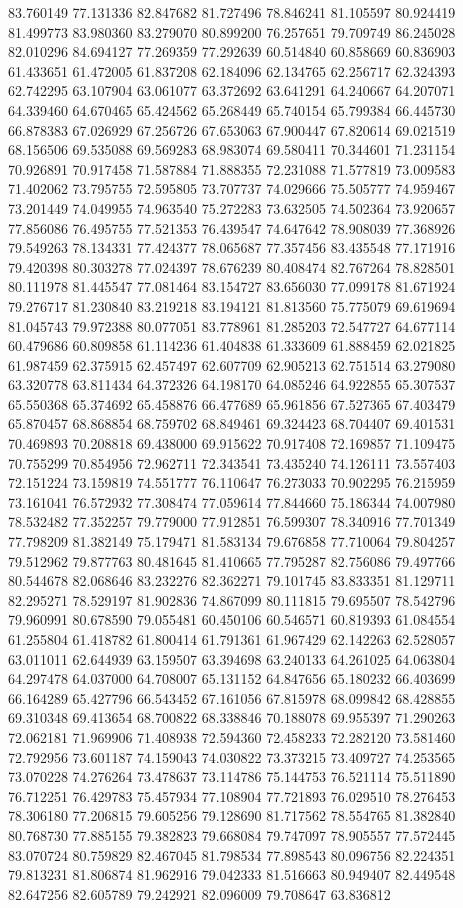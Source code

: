 83.760149
77.131336
82.847682
81.727496
78.846241
81.105597
80.924419
81.499773
83.980360
83.279070
80.899200
76.257651
79.709749
86.245028
82.010296
84.694127
77.269359
77.292639
60.514840
60.858669
60.836903
61.433651
61.472005
61.837208
62.184096
62.134765
62.256717
62.324393
62.742295
63.107904
63.061077
63.372692
63.641291
64.240667
64.207071
64.339460
64.670465
65.424562
65.268449
65.740154
65.799384
66.445730
66.878383
67.026929
67.256726
67.653063
67.900447
67.820614
69.021519
68.156506
69.535088
69.569283
68.983074
69.580411
70.344601
71.231154
70.926891
70.917458
71.587884
71.888355
72.231088
71.577819
73.009583
71.402062
73.795755
72.595805
73.707737
74.029666
75.505777
74.959467
73.201449
74.049955
74.963540
75.272283
73.632505
74.502364
73.920657
77.856086
76.495755
77.521353
76.439547
74.647642
78.908039
77.368926
79.549263
78.134331
77.424377
78.065687
77.357456
83.435548
77.171916
79.420398
80.303278
77.024397
78.676239
80.408474
82.767264
78.828501
80.111978
81.445547
77.081464
83.154727
83.656030
77.099178
81.671924
79.276717
81.230840
83.219218
83.194121
81.813560
75.775079
69.619694
81.045743
79.972388
80.077051
83.778961
81.285203
72.547727
64.677114
60.479686
60.809858
61.114236
61.404838
61.333609
61.888459
62.021825
61.987459
62.375915
62.457497
62.607709
62.905213
62.751514
63.279080
63.320778
63.811434
64.372326
64.198170
64.085246
64.922855
65.307537
65.550368
65.374692
65.458876
66.477689
65.961856
67.527365
67.403479
65.870457
68.868854
68.759702
68.849461
69.324423
68.704407
69.401531
70.469893
70.208818
69.438000
69.915622
70.917408
72.169857
71.109475
70.755299
70.854956
72.962711
72.343541
73.435240
74.126111
73.557403
72.151224
73.159819
74.551777
76.110647
76.273033
70.902295
76.215959
73.161041
76.572932
77.308474
77.059614
77.844660
75.186344
74.007980
78.532482
77.352257
79.779000
77.912851
76.599307
78.340916
77.701349
77.798209
81.382149
75.179471
81.583134
79.676858
77.710064
79.804257
79.512962
79.877763
80.481645
81.410665
77.795287
82.756086
79.497766
80.544678
82.068646
83.232276
82.362271
79.101745
83.833351
81.129711
82.295271
78.529197
81.902836
74.867099
80.111815
79.695507
78.542796
79.960991
80.678590
79.055481
60.450106
60.546571
60.819393
61.084554
61.255804
61.418782
61.800414
61.791361
61.967429
62.142263
62.528057
63.011011
62.644939
63.159507
63.394698
63.240133
64.261025
64.063804
64.297478
64.037000
64.708007
65.131152
64.847656
65.180232
66.403699
66.164289
65.427796
66.543452
67.161056
67.815978
68.099842
68.428855
69.310348
69.413654
68.700822
68.338846
70.188078
69.955397
71.290263
72.062181
71.969906
71.408938
72.594360
72.458233
72.282120
73.581460
72.792956
73.601187
74.159043
74.030822
73.373215
73.409727
74.253565
73.070228
74.276264
73.478637
73.114786
75.144753
76.521114
75.511890
76.712251
76.429783
75.457934
77.108904
77.721893
76.029510
78.276453
78.306180
77.206815
79.605256
79.128690
81.717562
78.554765
81.382840
80.768730
77.885155
79.382823
79.668084
79.747097
78.905557
77.572445
83.070724
80.759829
82.467045
81.798534
77.898543
80.096756
82.224351
79.813231
81.806874
81.962916
79.042333
81.516663
80.949407
82.449548
82.647256
82.605789
79.242921
82.096009
79.708647
63.836812
